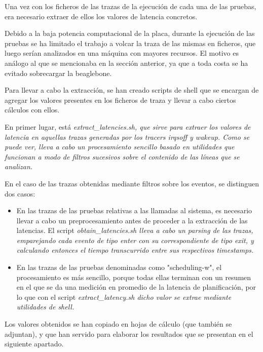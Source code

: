 \documentclass[../main.tex]{subfiles}
\begin{document}
Una vez con los ficheros de las trazas de la ejecución de cada una de las pruebas, era necesario extraer de ellos los valores de latencia concretos.

Debido a la baja potencia computacional de la placa, durante la ejecución de las pruebas se ha limitado el trabajo a volcar la traza de las mismas en ficheros, que luego serían analizados en una máquina con mayores recursos. El motivo es análogo al que se mencionaba en la sección anterior, ya que a toda costa se ha evitado sobrecargar la beaglebone.

Para llevar a cabo la extracción, se han creado scripts de shell que se encargan de agregar los valores presentes en los ficheros de traza y llevar a cabo ciertos cálculos con ellos.

En primer lugar, está \it{extract\_latencies.sh}, que sirve para extraer los valores de latencia en aquellas trazas generadas por los tracers \it{irqsoff} y \it{wakeup}. Como se puede ver, lleva a cabo un procesamiento sencillo basado en utilidades que funcionan a modo de filtros sucesivos sobre el contenido de las líneas que se analizan.

En el caso de las trazas obtenidas mediante filtros sobre los eventos, se distinguen dos casos:
\begin{itemize}
    \item En las trazas de las pruebas relativas a las llamadas al sistema, es necesario llevar a cabo un preprocesamiento antes de proceder a la extracción de las latencias. El script \it{obtain\_latencies.sh} lleva a cabo un parsing de las trazas, emparejando cada evento de tipo \it{enter} con su correspondiente de tipo \it{exit}, y calculando entonces el tiempo transcurrido entre sus respectivos timestamps.
    \item En las trazas de las pruebas denominadas como "scheduling-w", el procesamiento es más sencillo, porque todas ellas terminan con un resumen en el que se da una medición en promedio de la latencia de planificación, por lo que con el script \it{extract\_latency.sh} dicho valor se extrae mediante utilidades de shell.
\end{itemize}

Los valores obtenidos se han copiado en hojas de cálculo (que también se adjuntan), y que han servido para elaborar los resultados que se presentan en el siguiente apartado.
\end{document}
